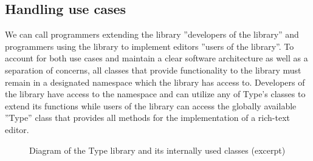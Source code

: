 


\subsection{Handling use cases}
\label{subsec:api_design_handling_use_cases}

We can call programmers extending the library ''developers of the library'' and programmers using the library to implement editors ''users of the library''. To account for both use cases and maintain a clear software architecture as well as a separation of concerns, all classes that provide functionality to the library must remain in a designated namespace which the library has access to. Developers of the library have access to the namespace and can utilize any of Type's classes to extend its functions while users of the library can access the globally available ''Type'' class that provides all methods for the implementation of a rich-text editor.

\begin{figure}[!htb]
\centering
{}
\caption{Diagram of the Type library and its internally used classes (excerpt)}
\label{fig:type_uml_excerpt}
\end{figure}

